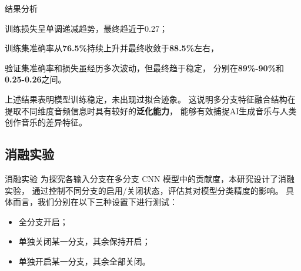 \documentclass[aspectratio=169]{beamer}
\begin{document}
\begin{frame}{结果分析}

  训练损失呈单调递减趋势，最终趋近于0.27；

  训练集准确率从\textbf{76.5\%}持续上升并最终收敛于\textbf{88.5\%}左右，

  验证集准确率和损失虽经历多次波动，但最终趋于稳定，
  分别在\textbf{89\%-90\%}和\textbf{0.25-0.26}之间。
 
  上述结果表明模型训练稳定，未出现过拟合迹象。
  这说明多分支特征融合结构在提取不同维度音频信息时具有较好的\textbf{泛化能力}，
  能够有效捕捉AI生成音乐与人类创作音乐的差异特征。

\end{frame}

\subsection{消融实验}
\begin{frame}{消融实验}
为探究各输入分支在多分支 CNN 模型中的贡献度，本研究设计了消融实验，
通过控制不同分支的启用/关闭状态，评估其对模型分类精度的影响。
具体而言，我们分别在以下三种设置下进行测试：
\begin{itemize}
  \item 全分支开启；
  \item 单独关闭某一分支，其余保持开启；
  \item 单独开启某一分支，其余全部关闭。
\end{itemize}
\end{frame}
\end{document}
